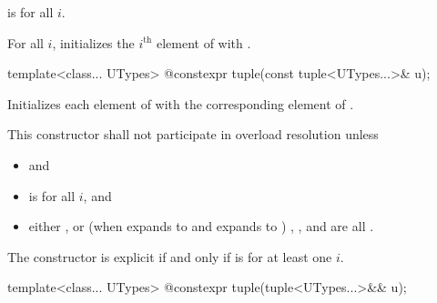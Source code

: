 \begin{itemdescr}
\pnum
\requires {} is  for all $i$.

\pnum
\effects For all $i$, initializes the $i^\text{th}$ element of  with
.
\end{itemdescr}

%
\begin{itemdecl}
template<class... UTypes> @\EXPLICIT@ constexpr tuple(const tuple<UTypes...>& u);
\end{itemdecl}

\begin{itemdescr}
\pnum
\effects Initializes each element of 
with the corresponding element of .

\pnum
\remarks This constructor shall not participate in overload resolution unless
\begin{itemize}
\item
{} \tcode{==}  and
\item
{} is  for all $i$, and
\item
either
, or
(when  expands to  and  expands to )
, , and  are all .
\end{itemize}
The constructor is explicit if and only if
 is 
for at least one $i$.
\end{itemdescr}

%
\begin{itemdecl}
template<class... UTypes> @\EXPLICIT@ constexpr tuple(tuple<UTypes...>&& u);
\end{itemdecl}

